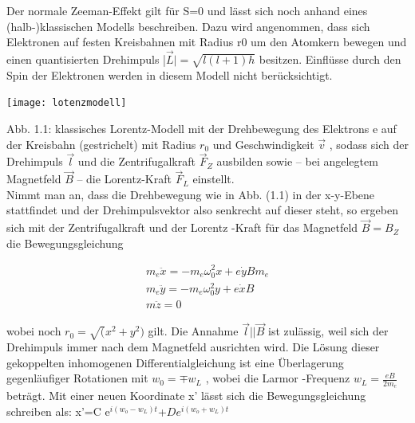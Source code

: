 \documentclass[10pt,a4paper]{article}
\begin{document}
Der normale Zeeman-Effekt gilt für S=0 und lässt sich noch anhand eines (halb-)klassischen Modells beschreiben. Dazu wird angenommen, dass sich Elektronen auf festen Kreisbahnen mit Radius r0  um den Atomkern bewegen und einen quantisierten Drehimpuls |$\overrightarrow{L}|=\sqrt{l(l+1)h}$ besitzen.  Einflüsse durch den Spin der Elektronen werden in diesem Modell nicht berücksichtigt.

\texttt{[image: lotenzmodell]}

Abb. 1.1: klassisches Lorentz-Modell mit der Drehbewegung des Elektrons e auf der Kreisbahn (gestrichelt) mit Radius $r_{0}$ und Geschwindigkeit $\overrightarrow{v}$ , sodass sich der Drehimpuls $\overrightarrow{l}$ und die Zentrifugalkraft $\overrightarrow{F}_{Z}$ ausbilden sowie – bei angelegtem Magnetfeld ⃗$\overrightarrow{B}$ – die Lorentz-Kraft ⃗$\overrightarrow{F}_{L}$ einstellt.\\


Nimmt man an, dass die Drehbewegung wie in Abb. (1.1) in der x-y-Ebene stattfindet und der Drehimpulsvektor also senkrecht auf dieser steht, so ergeben sich mit der Zentrifugalkraft
und der Lorentz -Kraft für das Magnetfeld $\overrightarrow{B}=B_{Z}$ die Bewegungsgleichung


\begin{align}
m_{e}\ddot x=−m_{e}\omega_{0}^2 x+e\dot{y}B m_{e}\\
m_{e}\ddot y=−m_{e}\omega_{0}^2 y+e\dot{x}B\\
m\ddot z=0 
\end{align}


wobei noch $r_{0}=\sqrt (x^2+y^2)$ gilt. Die Annahme $\overrightarrow{l}|| \overrightarrow{B}$  ist zulässig, weil sich der Drehimpuls immer nach dem Magnetfeld ausrichten wird. Die Lösung dieser gekoppelten inhomogenen Differentialgleichung ist eine Überlagerung gegenläufiger Rotationen mit $w_{0}= \mp w_{L}$ , wobei die Larmor -Frequenz $w_{L} = \frac{eB}{2m_{e}}$ beträgt. Mit einer neuen Koordinate x' lässt sich die Bewegungsgleichung schreiben als: x'=C e$^{i(w_{o}-w_{L})t}$+$D e^{i(w_{o}+w_{L})t}$
\\
\end{document}
